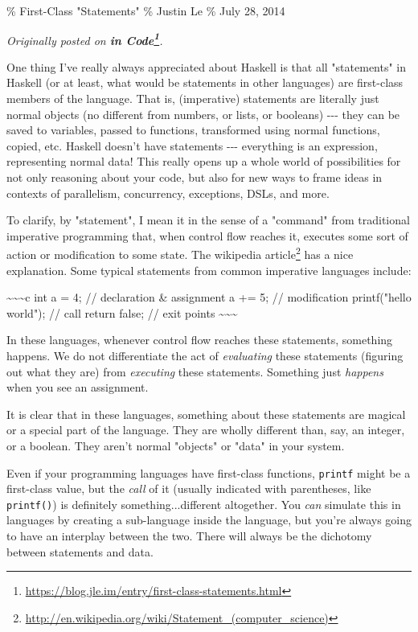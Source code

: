 \documentclass[]{article}
\renewcommand{\href}[2]{#2\footnote{\url{#1}}}
\begin{document}
\% First-Class "Statements" \% Justin Le \% July 28, 2014

\emph{Originally posted on
\textbf{\href{https://blog.jle.im/entry/first-class-statements.html}{in Code}}.}

One thing I've really always appreciated about Haskell is that all "statements"
in Haskell (or at least, what would be statements in other languages) are
first-class members of the language. That is, (imperative) statements are
literally just normal objects (no different from numbers, or lists, or booleans)
-\/-\/- they can be saved to variables, passed to functions, transformed using
normal functions, copied, etc. Haskell doesn't have statements -\/-\/-
everything is an expression, representing normal data! This really opens up a
whole world of possibilities for not only reasoning about your code, but also
for new ways to frame ideas in contexts of parallelism, concurrency, exceptions,
DSLs, and more.

To clarify, by "statement", I mean it in the sense of a "command" from
traditional imperative programming that, when control flow reaches it, executes
some sort of action or modification to some state. The
\href{http://en.wikipedia.org/wiki/Statement_(computer_science)}{wikipedia
article} has a nice explanation. Some typical statements from common imperative
languages include:

\textasciitilde{}\textasciitilde{}\textasciitilde{}c int a = 4; // declaration
\& assignment a += 5; // modification printf("hello world"); // call return
false; // exit points \textasciitilde{}\textasciitilde{}\textasciitilde{}

In these languages, whenever control flow reaches these statements, something
happens. We do not differentiate the act of \emph{evaluating} these statements
(figuring out what they are) from \emph{executing} these statements. Something
just \emph{happens} when you see an assignment.

It is clear that in these languages, something about these statements are
magical or a special part of the language. They are wholly different than, say,
an integer, or a boolean. They aren't normal "objects" or "data" in your system.

Even if your programming languages have first-class functions, \texttt{printf}
might be a first-class value, but the \emph{call} of it (usually indicated with
parentheses, like \texttt{printf()}) is definitely something...different
altogether. You \emph{can} simulate this in languages by creating a sub-language
inside the language, but you're always going to have an interplay between the
two. There will always be the dichotomy between statements and data.
\end{document}

